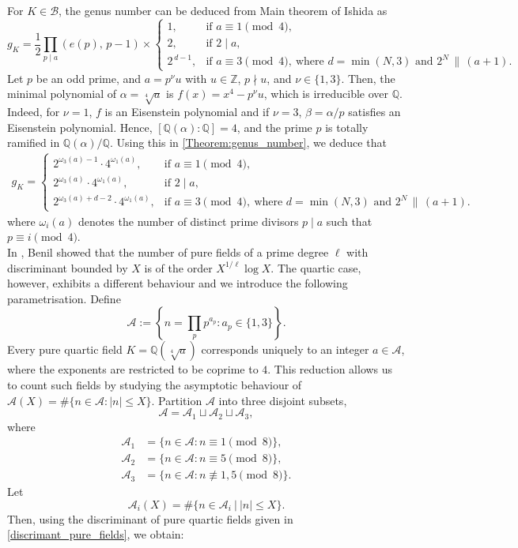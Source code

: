 \documentclass[11pt,reqno]{amsart}
\newcommand{\Q}{\mathbb{Q}}
\newcommand{\cB}{\mathcal{B}}
\theoremstyle{definition}
\theoremstyle{remark}
\begin{document}
\noindent
For $K\in \cB$, the genus number can be deduced from  Main theorem of Ishida \cite{Ish81} as
\begin{equation}\label{Theorem:genus_number}
    g_K
= \frac{1}{2} \prod_{p \mid a} (e(p),\, p-1)
\times
\begin{cases}
1, & \text{if } a \equiv 1 \pmod{4},\\[4pt]
2, & \text{if } 2 \mid a,\\[4pt]
2^{\,d-1}, & \text{if } a \equiv 3 \pmod{4},
\ \text{where } d = \min(N,3) \text{ and } 2^{N}\,\|\, (a+1).
\end{cases}
\end{equation}
Let $p$ be an odd prime, and $a=p^{\nu}u$ with $u\in\mathbb{Z}$, $p\nmid u$, and 
$\nu\in\{1,3\}$. Then, the minimal polynomial of $\alpha=\sqrt[4]{a}$ is $f(x)=x^{4}-p^{\nu}u$, which  is irreducible over $\Q$. Indeed, for $\nu=1$, $f$ is an Eisenstein polynomial and if $\nu=3$, $\beta=\alpha/p$ satisfies an Eisenstein polynomial. Hence, $[\mathbb{Q}(\alpha):\mathbb{Q}]=4$, and 
the prime $p$ is totally ramified in $\mathbb{Q}(\alpha)/\mathbb{Q}$. Using this in \eqref{Theorem:genus_number}, we deduce that
\begin{align*}
     g_K
    = 
\begin{cases}
 2^{\omega_3(a)-1} \cdot 4^{\omega_1(a)}, & \text{if } a \equiv 1 \pmod{4},\\[4pt]
 2^{\omega_3(a)} \cdot 4^{\omega_1(a)}, & \text{if } 2 \mid a,\\[4pt]
 2^{\omega_3(a)+d-2} \cdot 4^{\omega_1(a)}, & \text{if } a \equiv 3 \pmod{4},
\ \text{where } d = \min(N,3) \text{ and } 2^{N}\,\|\, (a+1).
\end{cases}
 \end{align*}
		where $ \omega_i(a) $ denotes the number of distinct prime divisors $ p \mid a $ such that $ p \equiv i \pmod{4} $.\\ 


 In \cite{Ben18}, Benil showed that the number of pure fields of a prime degree $\ell$ with discriminant bounded by $X$ is of the order $X^{1/\ell}\log X$. The quartic case, however, exhibits a different behaviour and we introduce the following parametrisation. Define
\[
\mathcal{A}
:= 
\left\{
n=\prod_{p} p^{a_{p}} : a_{p}\in\{1,3\}
\right\}.
\]
Every pure quartic field $K=\mathbb{Q}(\sqrt[4]{a})$ corresponds uniquely to an integer $a\in\mathcal{A}$, where the exponents are restricted to be 
coprime to $4$. This reduction allows us to count such fields by studying the asymptotic behaviour of 
$\mathcal{A}(X)=\#\{n\in\mathcal{A}:|n|\le X\}$. Partition $\mathcal{A}$ into three disjoint subsets,
\[
\mathcal{A} = \mathcal{A}_1 \sqcup \mathcal{A}_2 \sqcup \mathcal{A}_3,
\]
where
\[
\begin{aligned}
	\mathcal{A}_1 &= \{ n \in \mathcal{A} : n \equiv 1 \pmod{8} \},\\
	\mathcal{A}_2 &= \{ n \in \mathcal{A} : n \equiv 5 \pmod{8} \},\\
	\mathcal{A}_3 &= \{ n \in \mathcal{A} : n \not\equiv 1,5 \pmod{8} \}.
\end{aligned}
\]
Let
\[
\mathcal{A}_i(X) = \#\{ n \in \mathcal{A}_i \ | \ |n| \le X \}.
\]
Then, using the discriminant of pure quartic fields given in \eqref{discrimant_pure_fields}, we obtain:
\end{document}
